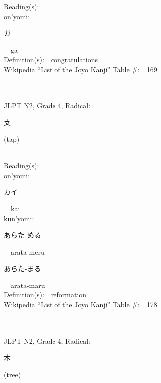 \begin{multicols}{2}
Reading(s):\ \ \\
{\hspace*{1em}}on'yomi:\ \ \\
{\hspace*{2em}}{\begin{CJK}{UTF8}{min} ガ \end{CJK}}\ \ ga\ \ \\
Definition(s):\ \ congratulations \\
Wikipedia ``List of the J\=oy\=o Kanji'' Table \#:\ \ 169 \\
\ \ \\
{\fontsize{34pt}{40pt}  }\ \ \\  %
{JLPT N2, Grade 4, Radical:\ \ {\begin{CJK}{UTF8}{min} 攴 \end{CJK}} (tap) } \\
Reading(s):\ \ \\
{\hspace*{1em}}on'yomi:\ \ \\
{\hspace*{2em}}{\begin{CJK}{UTF8}{min} カイ \end{CJK}}\ \ kai\ \ \\
{\hspace*{1em}}kun'yomi:\ \ \\
{\hspace*{2em}}{\begin{CJK}{UTF8}{min} あらた-める \end{CJK}}\ \ arata-meru\ \ \\
{\hspace*{2em}}{\begin{CJK}{UTF8}{min} あらた-まる \end{CJK}}\ \ arata-maru\ \ \\
Definition(s):\ \ reformation \\
Wikipedia ``List of the J\=oy\=o Kanji'' Table \#:\ \ 178 \\
\ \ \\
{\fontsize{34pt}{40pt}  }\ \ \\  %
{JLPT N2, Grade 4, Radical:\ \ {\begin{CJK}{UTF8}{min} 木 \end{CJK}} (tree) } \\

\end{multicols}
